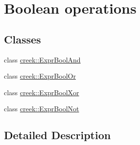 \hypertarget{group__expression__boolean}{}\section{Boolean operations}
\label{group__expression__boolean}
\subsection*{Classes}
\begin{DoxyCompactItemize}
\item 
class \hyperlink{classcreek_1_1_expr_bool_and}{creek\+::\+Expr\+Bool\+And}
\item 
class \hyperlink{classcreek_1_1_expr_bool_or}{creek\+::\+Expr\+Bool\+Or}
\item 
class \hyperlink{classcreek_1_1_expr_bool_xor}{creek\+::\+Expr\+Bool\+Xor}
\item 
class \hyperlink{classcreek_1_1_expr_bool_not}{creek\+::\+Expr\+Bool\+Not}
\end{DoxyCompactItemize}


\subsection{Detailed Description}
